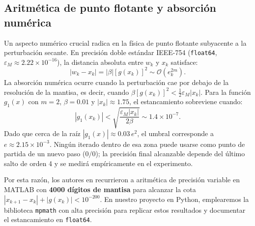 \documentclass[10pt, a4paper]{article}
\begin{document}
\subsection{Aritmética de punto flotante y absorción numérica}
Un aspecto numérico crucial radica en la física de punto flotante subyacente a la perturbación secante. En precisión doble estándar IEEE-754 (\texttt{float64}, $\varepsilon_M \approx 2.22 \times 10^{-16}$), la distancia absoluta entre $w_k$ y $x_k$ satisface:
\begin{equation}
    |w_k - x_k| = |\beta| [g(x_k)]^2 \sim \mathcal{O}(e_k^{2m}). \label{eq:absorcion}
\end{equation}
La absorción numérica ocurre cuando la perturbación cae por debajo de la resolución de la mantisa, es decir, cuando $\beta [g(x_k)]^2 < \frac{1}{2} \varepsilon_M |x_k|$. Para la función $g_1(x)$ con $m=2$, $\beta=0.01$ y $|x_k|\approx 1.75$, el estancamiento sobreviene cuando:
\begin{equation}
    |g_1(x_k)| < \sqrt{\frac{\varepsilon_M |x_k|}{2\beta}} \sim 1.4 \times 10^{-7}.
\end{equation}
Dado que cerca de la raíz $|g_1(x)|\approx0.03\,e^2$, el umbral corresponde a $e\approx2.15\times10^{-3}$. Ningún iterado dentro de esa zona puede usarse como punto de partida de un nuevo paso ($0/0$); la precisión final alcanzable depende del último salto de orden 4 y se medirá empíricamente en el experimento.

Por esta razón, los autores en \cite{Jerezano2026} recurrieron a aritmética de precisión variable en MATLAB con \textbf{4000 dígitos de mantisa} para alcanzar la cota $|x_{k+1}-x_k| + |g(x_k)| < 10^{-200}$. En nuestro proyecto en Python, emplearemos la biblioteca \texttt{mpmath} \cite{mpmath2024} con alta precisión para replicar estos resultados y documentar el estancamiento en \texttt{float64}.
\end{document}
